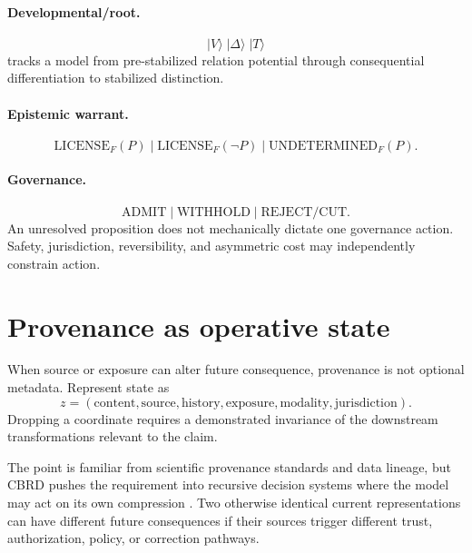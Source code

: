 \paragraph{Developmental/root.}
\begin{equation}
|V\rangle\;|\Delta\rangle\;|T\rangle
\end{equation}
tracks a model from pre-stabilized relation potential through consequential differentiation to stabilized distinction.

\paragraph{Epistemic warrant.}
\begin{equation}
\mathrm{LICENSE}_F(P)\;|\;\mathrm{LICENSE}_F(\neg P)\;|\;\mathrm{UNDETERMINED}_F(P).
\end{equation}

\paragraph{Governance.}
\begin{equation}
\mathrm{ADMIT}\;|\;\mathrm{WITHHOLD}\;|\;\mathrm{REJECT/CUT}.
\end{equation}
An unresolved proposition does not mechanically dictate one governance action. Safety, jurisdiction, reversibility, and asymmetric cost may independently constrain action.

\section{Provenance as operative state}

When source or exposure can alter future consequence, provenance is not optional metadata. Represent state as
\begin{equation}
z=(\text{content},\text{source},\text{history},\text{exposure},\text{modality},\text{jurisdiction}).
\end{equation}
Dropping a coordinate requires a demonstrated invariance of the downstream transformations relevant to the claim.

The point is familiar from scientific provenance standards and data lineage, but CBRD pushes the requirement into recursive decision systems where the model may act on its own compression \cite{W3CProvDM2013}. Two otherwise identical current representations can have different future consequences if their sources trigger different trust, authorization, policy, or correction pathways.

